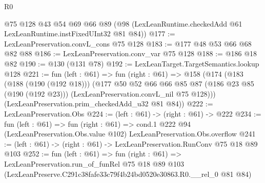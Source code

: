 \begin{lexlean}{R0}
\begin{coremodule}
    @75
    @128
    @43
    @54
    @69
    @66
    @89
    (@98 (LexLeanRuntime.checkedAdd @61 LexLeanRuntime.instFixedUInt32 @81 @84))
@177 := LexLeanPreservation.convL_cons @75 @128
@183 := @177 @48 @53 @66 @68 @82 @88
@186 := LexLeanPreservation.conv_var @75 @128
@188 := @186 @18 @82
@190 := @130 (@131 @78)
@192 := LexLeanTarget.TargetSemantics.lookup @128
@221 := fun (left : @61) =>
  fun (right : @61) =>
  @158
    (@174
      (@183
        (@188 (@190 (@192 @18)))
        (@177
          @50
          @52
          @66
          @66
          @85
          @87
          (@186 @23 @85 (@190 (@192 @23)))
          (LexLeanPreservation.convL_nil @75 @128)))
      (LexLeanPreservation.prim_checkedAdd_u32 @81 @84))
@222 := LexLeanPreservation.Obs
@224 := (left : @61) -> (right : @61) -> @222
@234 := fun (left : @61) =>
  fun (right : @61) =>
  cond.{1} @222 @94 (LexLeanPreservation.Obs.value @102) LexLeanPreservation.Obs.overflow
@241 := (left : @61) -> (right : @61) -> LexLeanPreservation.RunConv @75 @18 @89 @103
@252 := fun (left : @61) =>
  fun (right : @61) =>
  LexLeanPreservation.run_of_funRel
    @75
    @18
    @89
    @103
    (LexLeanPreserve.C291c38fafe33c79f4b24bd0520e30863.R0.__rel_0 @81 @84)
\end{coremodule}
\end{lexlean}
